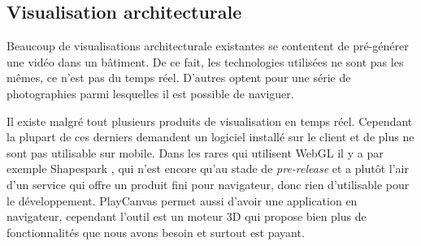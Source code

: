 \subsection{Visualisation architecturale}
Beaucoup de visualisations architecturale existantes se contentent de pré-générer une vidéo dans un bâtiment. De ce fait, les technologies utilisées ne sont pas les mêmes, ce n'est pas du temps réel. D'autres optent pour une série de photographies parmi lesquelles il est possible de naviguer. 

Il existe malgré tout plusieurs produits de visualisation en temps réel. Cependant la plupart de ces derniers demandent un logiciel installé sur le client et de plus ne sont pas utilisable sur mobile. Dans les rares qui utilisent WebGL il y a par exemple Shapespark \cite{architecture-shapespark}, qui n'est encore qu'au stade de \emph{pre-release} et a plutôt l'air d'un service qui offre un produit fini pour navigateur, donc rien d'utilisable pour le développement. PlayCanvas \cite{playcanvas-architecture} permet aussi d'avoir une application en navigateur, cependant l'outil est un moteur 3D qui propose bien plus de fonctionnalités que nous avons besoin et surtout est payant.